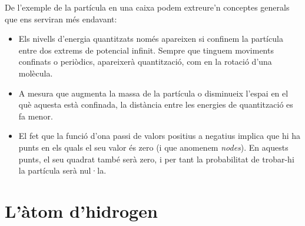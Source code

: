 De l'exemple de la partícula en una caixa podem extreure'n conceptes generals que ens serviran més endavant:
\begin{itemize}
\item Els nivells d'energia quantitzats només apareixen si confinem la partícula entre dos extrems de potencial infinit. Sempre que tinguem moviments confinats o periòdics, apareixerà quantització, com en la rotació d'una molècula.
\item A mesura que augmenta la massa de la partícula o disminueix l'espai en el què aquesta està confinada, la distància entre les energies de quantització es fa menor.
\item El fet que la funció d'ona passi de valors positius a negatius implica que hi ha punts en els quals el seu valor és zero (i que anomenem \textit{nodes}). En aquests punts, el seu quadrat també serà zero, i per tant la probabilitat de trobar-hi la partícula serà nul·la.
\end{itemize}
\section{L'àtom d'hidrogen}

